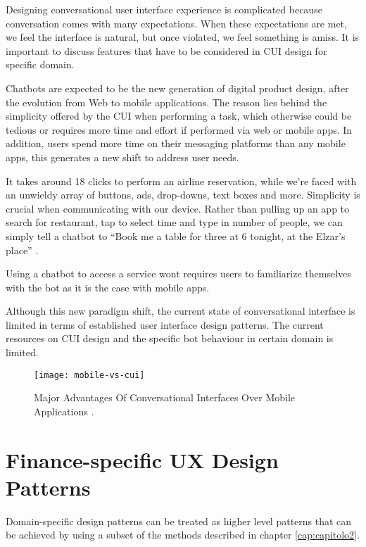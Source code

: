 



Designing conversational user interface experience is complicated because conversation comes with many expectations. When these expectations are met, we feel the interface is natural, but once violated, we feel something is amiss. It is important to discuss features that have to be considered in CUI design for specific domain. 

Chatbots are expected to be the new generation of digital product design, after the evolution from Web to mobile applications. The reason lies behind the simplicity offered by the CUI when performing a task, which otherwise could be tedious or requires more time and effort if performed via web or mobile apps. In addition, users spend more time on their messaging platforms than any mobile apps, this generates a new shift to address user needs.

It takes around 18 clicks to perform an airline reservation, while we’re faced with an unwieldy array of buttons, ads, drop-downs, text boxes and more. Simplicity is crucial when communicating with our device. Rather than pulling up an app to search for restaurant, tap to select time and type in number of people, we can simply tell a chatbot to “Book me a table for three at 6 tonight, at the Elzar’s place” \cite{zakos2008}.

Using a chatbot to access a service wont requires users to familiarize themselves with the bot as it is the case with mobile apps.

Although this new paradigm shift, the current state of conversational interface is limited in terms of established user interface design patterns. The current resources on CUI design and the specific bot behaviour in certain domain is limited.

\begin{figure}[htb]
	\centering
	\texttt{[image: mobile-vs-cui]}
	\caption{Major Advantages Of Conversational Interfaces Over Mobile Applications \cite{fadhil2018}.}
	\label{mobile-vs-cui}
\end{figure}


\section{Finance-specific UX Design Patterns}
Domain-specific design patterns can be treated as higher level patterns that can be achieved by using a subset of the methods described in chapter \ref{cap:capitolo2}. 

